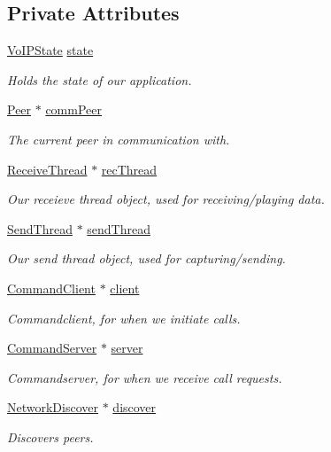 \subsection*{\-Private \-Attributes}
\begin{DoxyCompactItemize}
\item 
\hyperlink{class_state_controller_a1aabd2155d8e6feb201ed3941e4ee2be}{\-Vo\-I\-P\-State} \hyperlink{class_state_controller_a5bed5dd92c56a936d1e3be5ab4d74dde}{state}
\begin{DoxyCompactList}\small\item\em \-Holds the state of our application. \end{DoxyCompactList}\item 
\hyperlink{class_peer}{\-Peer} $\ast$ \hyperlink{class_state_controller_af5bd2961c916c50a04fdeaf9de4cc372}{comm\-Peer}
\begin{DoxyCompactList}\small\item\em \-The current peer in communication with. \end{DoxyCompactList}\item 
\hyperlink{class_receive_thread}{\-Receive\-Thread} $\ast$ \hyperlink{class_state_controller_a21b3edaa3df30d5162650e0f0f296fe8}{rec\-Thread}
\begin{DoxyCompactList}\small\item\em \-Our receieve thread object, used for receiving/playing data. \end{DoxyCompactList}\item 
\hyperlink{class_send_thread}{\-Send\-Thread} $\ast$ \hyperlink{class_state_controller_a27d6bac0bcc3c658bfcca57803c07fb1}{send\-Thread}
\begin{DoxyCompactList}\small\item\em \-Our send thread object, used for capturing/sending. \end{DoxyCompactList}\item 
\hyperlink{class_command_client}{\-Command\-Client} $\ast$ \hyperlink{class_state_controller_a35b8a763ca35b05a66968a6aa02da269}{client}
\begin{DoxyCompactList}\small\item\em \-Commandclient, for when we initiate calls. \end{DoxyCompactList}\item 
\hyperlink{class_command_server}{\-Command\-Server} $\ast$ \hyperlink{class_state_controller_a3c06ffd0c04de0c000d07d02b03557f1}{server}
\begin{DoxyCompactList}\small\item\em \-Commandserver, for when we receive call requests. \end{DoxyCompactList}\item 
\hyperlink{class_network_discover}{\-Network\-Discover} $\ast$ \hyperlink{class_state_controller_a5f4aa78836675a669da7c8a08d613af5}{discover}
\begin{DoxyCompactList}\small\item\em \-Discovers peers. \end{DoxyCompactList}\end{DoxyCompactItemize}


